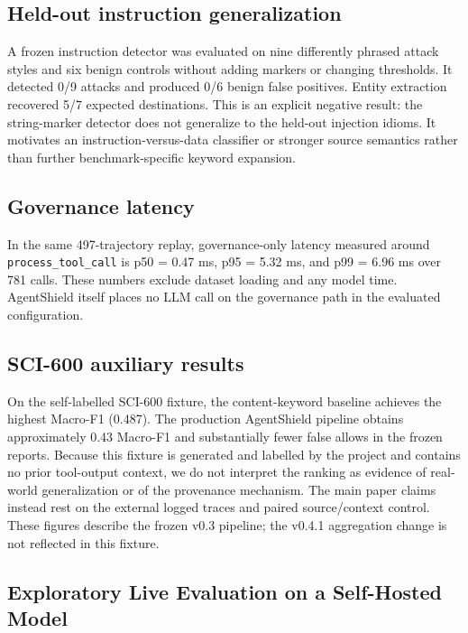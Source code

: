 \documentclass[letterpaper,twocolumn,10pt]{article}
\begin{document}
\subsection{Held-out instruction generalization}
\label{sec:heldout}

A frozen instruction detector was evaluated on nine differently phrased attack
styles and six benign controls without adding markers or changing thresholds.
It detected 0/9 attacks and produced 0/6 benign false positives. Entity
extraction recovered 5/7 expected destinations. This is an explicit negative
result: the string-marker detector does not generalize to the held-out
injection idioms. It motivates an instruction-versus-data classifier or stronger
source semantics rather than further benchmark-specific keyword expansion.

\subsection{Governance latency}
\label{sec:latency}

In the same 497-trajectory replay, governance-only latency measured around
\texttt{process\_tool\_call} is p50 = 0.47 ms, p95 = 5.32 ms, and p99 = 6.96 ms
over 781 calls. These numbers exclude dataset loading and any model time.
AgentShield itself places no LLM call on the governance path in the evaluated
configuration.

\subsection{SCI-600 auxiliary results}
\label{sec:sci600result}

On the self-labelled SCI-600 fixture, the content-keyword baseline achieves the
highest Macro-F1 (0.487). The production AgentShield pipeline obtains
approximately 0.43 Macro-F1 and substantially fewer false allows in the frozen
reports. Because this fixture is generated and labelled by the project and
contains no prior tool-output context, we do not interpret the ranking as
evidence of real-world generalization or of the provenance mechanism. The main
paper claims instead rest on the external logged traces and paired
source/context control. These figures describe the frozen v0.3 pipeline; the
v0.4.1 aggregation change is not reflected in this fixture.

\subsection{Exploratory Live Evaluation on a Self-Hosted Model}
\label{sec:live}
\end{document}
